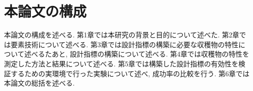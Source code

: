 \section{本論文の構成}
本論文の構成を述べる.
第1章では本研究の背景と目的について述べた.
第2章では要素技術について述べる.
第3章では設計指標の構築に必要な収穫物の特性について述べるたあと, 設計指標の構築について述べる.
第4章では収穫物の特性を測定した方法と結果について述べる.
第5章では構築した設計指標の有効性を検証するための実環境で行った実験について述べ, 成功率の比較を行う.
第6章では本論文の総括を述べる.